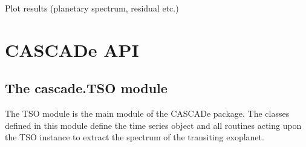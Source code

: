 \documentclass[a4paper,10pt,english]{sphinxmanual}
\begin{document}
Plot results (planetary spectrum, residual etc.)

%
\begin{sphinxVerbatim}[commandchars=\\\{\}]
\end{sphinxVerbatim}


\section{CASCADe API}
\label{\detokenize{cascade:cascade-api}}\label{\detokenize{cascade::doc}}

\subsection{The cascade.TSO module}
\label{\detokenize{cascade.TSO:module-cascade.TSO.TSO}}\label{\detokenize{cascade.TSO:the-cascade-tso-module}}\label{\detokenize{cascade.TSO::doc}}
The TSO module is the main module of the CASCADe package.
The classes defined in this module define the time series object and
all routines acting upon the TSO instance to extract the spectrum of the
transiting exoplanet.
\end{document}
